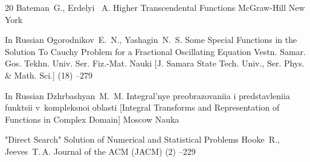 \begin{thebibliography}{20}
\by Bateman~G., Erdelyi ~A.
\book Higher Transcendental Functions
\publ McGraw-Hill
\publaddr New York

\lang In Russian
\by Ogorodnikov~E.~N., Yashagin~N.~S.
\paper Some Special Functions in the Solution To Cauchy Problem for a Fractional Oscillating Equation
\jour Vestn. Samar. Gos. Tekhn. Univ. Ser. Fiz.-Mat. Nauki \rm [J. Samara State Tech. Univ., Ser. Phys. \& Math. Sci.]
(18)
--279

\lang In Russian
\by Dzhrbashyan~M.~M.
\book Integral'nye preobrazovaniia i predstavleniia funktsii v~kompleksnoi oblasti \rm [Integral Transforms and Representation of Functions in Complex Domain]
\publaddr Moscow
\publ Nauka

\paper  "Direct Search" Solution of Numerical and Statistical Problems
\by Hooke~R.,  Jeeves~T.\,A.
\jour Journal of the ACM (JACM)
(2)
--229

\end{thebibliography}

\EngDate



